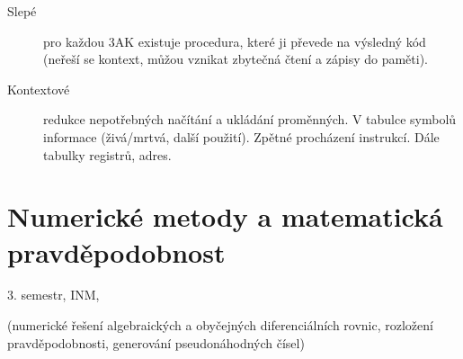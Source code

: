 \documentclass[a4wide]{report}
\begin{document}
\begin{description}
	\item[Slepé] pro každou 3AK existuje procedura, které ji převede na výsledný kód (neřeší se kontext, můžou vznikat zbytečná čtení a zápisy do paměti).
	\item[Kontextové] redukce nepotřebných načítání a ukládání proměnných. V tabulce symbolů informace (živá/mrtvá, další použití). Zpětné procházení instrukcí. Dále tabulky registrů, adres.
\end{description}












































\chapter{Numerické metody a matematická pravděpodobnost} \label{cha:23}

3. semestr, INM, 

(numerické řešení algebraických a obyčejných diferenciálních rovnic, rozložení pravděpodobnosti, generování pseudonáhodných čísel)
\end{document}

